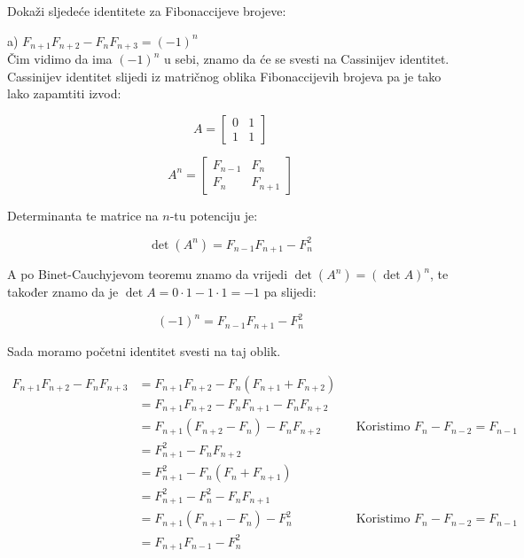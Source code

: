 \documentclass[exam.tex]{subfiles}
\begin{document}
	Dokaži sljedeće identitete za Fibonaccijeve brojeve:
	
	a) \( F_{n + 1} F_{n + 2} - F_n F_{n + 3} = (-1)^n \)\\
	
	Čim vidimo da ima \( (-1)^n \) u sebi, znamo da će se svesti na Cassinijev identitet. Cassinijev identitet slijedi iz matričnog oblika Fibonaccijevih brojeva pa je tako lako zapamtiti izvod:
	
	$$ A =  \begin{bmatrix}
		0 & 1 \\
		1 & 1 
	\end{bmatrix}  $$
	
	$$ A^n =  \begin{bmatrix}
		F_{n - 1} & F_n \\
		F_n & F_{n + 1}
	\end{bmatrix} $$
	
	Determinanta te matrice na \(n\)-tu potenciju je:
	
	\[ \det (A^n) = F_{n - 1} F_{n + 1} - F^2_n \]
	
	A po Binet-Cauchyjevom teoremu znamo da vrijedi \( \det (A^n) = (\det A)^n \), te također znamo da je \( \det A = 0 \cdot 1 - 1 \cdot 1 = -1 \) pa slijedi:
	
	\[ (-1)^n = F_{n - 1} F_{n + 1} - F^2_n \]
	
	Sada moramo početni identitet svesti na taj oblik. 
	
	\begin{align*}
		F_{n + 1} F_{n + 2} - F_n F_{n + 3} &= F_{n + 1} F_{n + 2} - F_n (F_{n + 1} + F_{n + 2}) \\
		&= F_{n + 1} F_{n + 2} - F_n F_{n + 1} - F_n F_{n + 2} \\
		&= F_{n + 1} (F_{n + 2} - F_n) - F_n F_{n + 2} && \text{Koristimo } F_n - F_{n - 2} = F_{n - 1}\\
		&= F^2_{n + 1} - F_n F_{n + 2} \\
		&= F^2_{n + 1} - F_n (F_n + F_{n + 1}) \\
		&= F^2_{n + 1} - F^2_n - F_n F_{n + 1} \\
		&= F_{n + 1} (F_{n + 1} - F_n) - F_n^2 && \text{Koristimo } F_n - F_{n - 2} = F_{n - 1}\\
		&= F_{n + 1} F_{n - 1} - F_n^2
	\end{align*}
\end{document}
